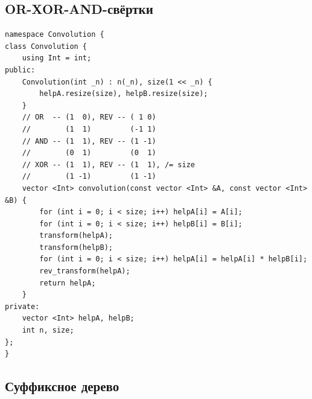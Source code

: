 \documentclass[10pt, portrait,letterpaper]{article}
\begin{document}
\subsection{OR-XOR-AND-свёртки}

\begin{verbatim}
namespace Convolution {
class Convolution {
    using Int = int;
public:
    Convolution(int _n) : n(_n), size(1 << _n) {
        helpA.resize(size), helpB.resize(size);
    }
    // OR  -- (1  0), REV -- ( 1 0)
    //        (1  1)         (-1 1)
    // AND -- (1  1), REV -- (1 -1)
    //        (0  1)         (0  1)
    // XOR -- (1  1), REV -- (1  1), /= size
    //        (1 -1)         (1 -1)
    vector <Int> convolution(const vector <Int> &A, const vector <Int> &B) {
        for (int i = 0; i < size; i++) helpA[i] = A[i];
        for (int i = 0; i < size; i++) helpB[i] = B[i];
        transform(helpA);
        transform(helpB);
        for (int i = 0; i < size; i++) helpA[i] = helpA[i] * helpB[i];
        rev_transform(helpA);
        return helpA;
    }
private:
    vector <Int> helpA, helpB;
    int n, size;
};
}\end{verbatim}

\subsection{Суффиксное дерево}
\end{document}
